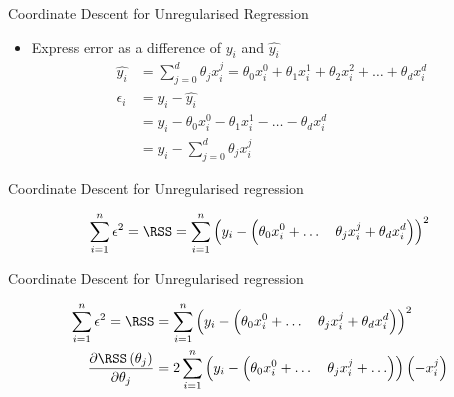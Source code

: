 \documentclass{beamer}
\begin{document}
\begin{frame}{Coordinate Descent for Unregularised Regression}

\begin{itemize}[<+->]
	
	
	
	
	
	\item Express error as a difference of $y_{i}$ and $\hat{y_{i}}$
	\begin{align}
	\hat{y_i} &= \sum_{j=0}^{d} \theta_{j}x^{j}_{i} = \theta_{0}x_{i}^{0} + \theta_{1}x_{i}^{1} +\theta_{2}x_{i}^{2} + \ldots + \theta_{d}x_{i}^{d}  \\
	\epsilon_{i} &= y_{i} - \hat{y_{i}}\\
	&= y_{i} - \theta_{0}x_{i}^{0} - \theta_{1}x_{i}^{1} - \ldots - \theta_{d}x_{i}^{d}\\
	&= y_{i} - \sum_{j=0}^{d} \theta_{j}x_{i}^{j}
	\end{align}
	
	
	
\end{itemize}


\end{frame}



\begin{frame}{Coordinate Descent for Unregularised regression}

\begin{align*}
\sum_{i=1}^{n}  \epsilon^{2}=\RSS &=\sum_{i=1}^{n}\left(y_{i}-\left(\theta_{0}x_{i}^{0}+\ldots \quad \theta_{j} x_{i}^{j}+\theta_{d} x_{i}^{d}\right)\right)^{2}\\
\end{align*}
\end{frame}

\begin{frame}{Coordinate Descent for Unregularised regression}

\begin{align*}
\sum_{i=1}^{n}  \epsilon^{2}=\RSS &=\sum_{i=1}^{n}\left(y_{i}-\left(\theta_{0}x_{i}^{0}+\ldots \quad \theta_{j} x_{i}^{j}+\theta_{d} x_{i}^{d}\right)\right)^{2}\\
\frac{\partial \RSS\left(\theta_{j}\right)}{\partial \theta_{j}}&= 2 \sum_{i=1}^{n}\left(y_{i}-\left(\theta_{0}x_{i}^{0}+\ldots \quad \theta_{j} x_{i}^{j}+\ldots \right)\right)\left(-x_{i}^{j}\right)\\
\end{align*}
\end{frame}
\end{document}
